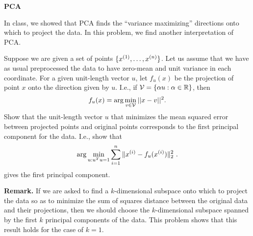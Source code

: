 \item {} {\bf PCA} 

In class, we showed that PCA finds the ``variance maximizing'' directions onto
which to project the data.  In this problem, we find another interpretation of PCA. 

Suppose we are given a set of points $\{x^{(1)},\ldots,x^{(\nexp)}\}$. Let us
assume that we have as usual preprocessed the data to have zero-mean and unit variance
in each coordinate.  For a given unit-length vector $u$, let $f_u(x)$ be the 
projection of point $x$ onto the direction given by $u$.  I.e., if 
${\cal V} = \{\alpha u : \alpha \in \Re\}$, then 
\[
f_u(x) = \arg \min_{v\in {\cal V}} ||x-v||^2.
\]
Show that the unit-length vector $u$ that minimizes the 
mean squared error between projected points and original points corresponds
to the first principal component for the data. I.e., show that
$$ \arg \min_{u:u^Tu=1} \sum_{i=1}^\nexp \|x^{(i)}-f_u(x^{(i)})\|_2^2 \ .$$
gives the first principal component.


{\bf Remark.} If we are asked to find a $k$-dimensional subspace onto which to
project the data so as to minimize the sum of squares distance between the
original data and their projections, then we should choose the $k$-dimensional
subspace spanned by the first $k$ principal components of the data.  This problem
shows that this result holds for the case of $k=1$.

\ifnum{} {
  
} \fi

  

